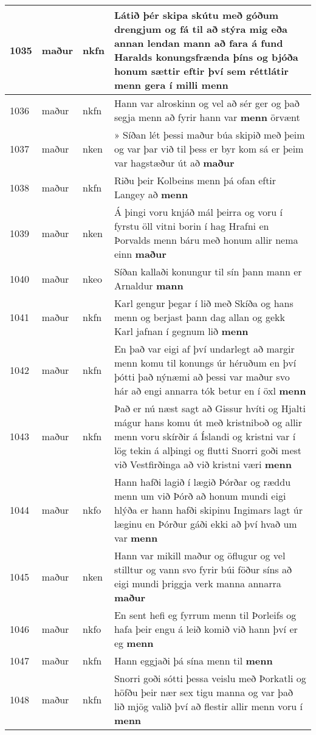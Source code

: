 \documentclass{article}
\begin{document}
\begin{longtable}{p{1cm}|p{1cm}|p{1cm}|p{13cm}}
\hline
1035&maður&nkfn&Látið þér skipa skútu með góðum drengjum og fá til að stýra mig eða annan lendan mann að fara á fund Haralds konungsfrænda þíns og bjóða honum sættir eftir því sem réttlátir menn gera í milli \textbf{menn} \\
\hline
1036&maður&nkfn&Hann var alroskinn og vel að sér ger og það segja menn að fyrir hann var \textbf{menn} örvænt\\
\hline
1037&maður&nken&» Síðan lét þessi maður búa skipið með þeim og var þar við til þess er byr kom sá er þeim var hagstæður út að \textbf{maður} \\
\hline
1038&maður&nkfn&Riðu þeir Kolbeins menn þá ofan eftir Langey að \textbf{menn} \\
\hline
1039&maður&nken&Á þingi voru knjáð mál þeirra og voru í fyrstu öll vitni borin í hag Hrafni en Þorvalds menn báru með honum allir nema einn \textbf{maður} \\
\hline
1040&maður&nkeo&Síðan kallaði konungur til sín þann mann er Arnaldur \textbf{mann} \\
\hline
1041&maður&nkfn&Karl gengur þegar í lið með Skíða og hans menn og berjast þann dag allan og gekk Karl jafnan í gegnum lið \textbf{menn} \\
\hline
1042&maður&nkfn&En það var eigi af því undarlegt að margir menn komu til konungs úr héruðum en því þótti það nýnæmi að þessi var maður svo hár að engi annarra tók betur en í öxl \textbf{menn} \\
\hline
1043&maður&nkfn&Það er nú næst sagt að Gissur hvíti og Hjalti mágur hans komu út með kristniboð og allir menn voru skírðir á Íslandi og kristni var í lög tekin á alþingi og flutti Snorri goði mest við Vestfirðinga að við kristni væri \textbf{menn} \\
\hline
1044&maður&nkfo&Hann hafði lagið í lægið Þórðar og ræddu menn um við Þórð að honum mundi eigi hlýða er hann hafði skipinu Ingimars lagt úr læginu en Þórður gáði ekki að því hvað um var \textbf{menn} \\
\hline
1045&maður&nken&Hann var mikill maður og öflugur og vel stilltur og vann svo fyrir búi föður síns að eigi mundi þriggja verk manna annarra \textbf{maður} \\
\hline
1046&maður&nkfo&En sent hefi eg fyrrum menn til Þorleifs og hafa þeir engu á leið komið við hann því er eg \textbf{menn} \\
\hline
1047&maður&nkfn&Hann eggjaði þá sína menn til \textbf{menn} \\
\hline
1048&maður&nkfn&Snorri goði sótti þessa veislu með Þorkatli og höfðu þeir nær sex tigu manna og var það lið mjög valið því að flestir allir menn voru í \textbf{menn} \\

\end{longtable}
\end{document}

